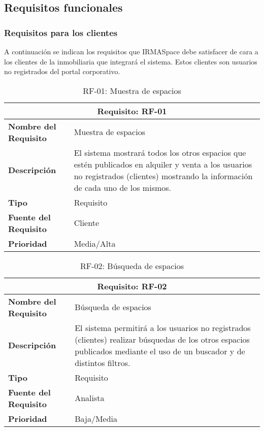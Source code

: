 \subsection{Requisitos funcionales}

\subsubsection{Requisitos para los clientes}

\par A continuación se indican los requisitos que IRMASpace debe satisfacer de cara a los clientes de la inmobiliaria que integrará el sistema. Estos clientes son usuarios no registrados del portal corporativo.

\begin{table}[H]
\begin{center}
\begin{tabular}{p{} p{7cm}}
\multicolumn{2}{c}{\textbf{Requisito: RF-01} } \\
\hline \hline
\textbf{Nombre del Requisito} &  Muestra de espacios \\
\hline
\textbf{Descripción} & El sistema mostrará todos los otros espacios que estén publicados en alquiler y venta a los usuarios no registrados (clientes) mostrando la información de cada uno de los mismos.\\
\hline
\textbf{Tipo} & Requisito  \\
\hline
\textbf{Fuente del Requisito} &  Cliente \\
\hline
\textbf{Prioridad} &  Media/Alta \\ \hline
\end{tabular}
\caption{RF-01: Muestra de espacios}
\label{tab:RF-01}
\end{center}
\end{table}

\begin{table}[H]
\begin{center}
\begin{tabular}{p{} p{7cm}}
\multicolumn{2}{c}{\textbf{Requisito: RF-02} } \\
\hline \hline
\textbf{Nombre del Requisito} &  Búsqueda de espacios \\
\hline
\textbf{Descripción} & El sistema permitirá a los usuarios no registrados (clientes) realizar búsquedas de los otros espacios publicados mediante el uso de un buscador y de distintos filtros. \\
\hline
\textbf{Tipo} & Requisito  \\
\hline
\textbf{Fuente del Requisito} &  Analista \\
\hline
\textbf{Prioridad} &  Baja/Media \\ \hline
\end{tabular}
\caption{RF-02: Búsqueda de espacios}
\label{tab:RF-02}
\end{center}
\end{table}

